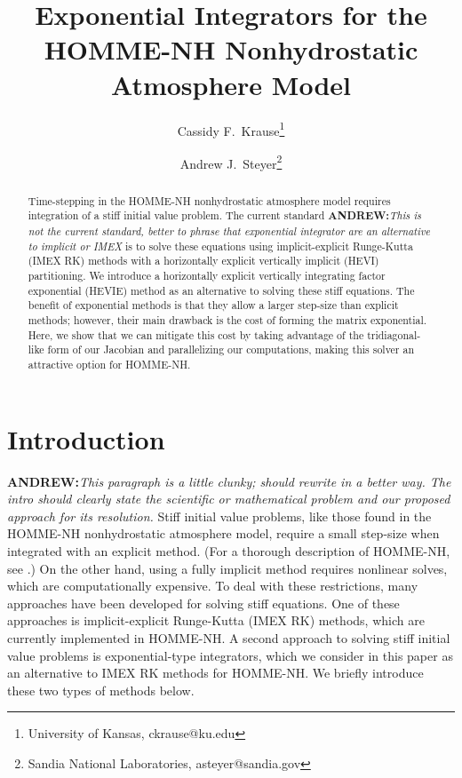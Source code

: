 \documentclass{csri19}
\title{Exponential Integrators for the HOMME-NH Nonhydrostatic Atmosphere
 Model}
\author{Cassidy F.\ Krause\thanks{University of Kansas, ckrause@ku.edu}
\and Andrew J.\ Steyer\thanks{Sandia National Laboratories, asteyer@sandia.gov}}
\newcommand{\A}[1]{\textbf{ANDREW:}\textit{#1}}
\begin{document}
\maketitle

\begin{abstract}
Time-stepping in the HOMME-NH nonhydrostatic atmosphere model requires 
integration of a stiff initial value problem. The current standard \A{This is not the current standard, better to phrase that exponential integrator are an alternative to implicit or IMEX} is to 
solve these equations using implicit-explicit Runge-Kutta (IMEX RK) 
methods with a horizontally explicit vertically implicit (HEVI) 
partitioning. We introduce a horizontally explicit vertically integrating 
factor exponential (HEVIE) method as an alternative to solving 
these stiff equations. The benefit of exponential methods is that they 
allow a larger step-size than explicit methods; however, their main 
drawback is the cost of forming the matrix exponential. Here, we show that 
we can mitigate this cost by taking advantage of the tridiagonal-like form 
of our Jacobian and parallelizing our computations, making this solver an 
attractive option for HOMME-NH.
\end{abstract}

\section{Introduction} \label{CFK:sec:intro}
\A{This paragraph is a little clunky; should rewrite in a better way.  The intro should clearly state the scientific or mathematical problem and our proposed approach for its resolution.}
Stiff initial value problems, like those found in the HOMME-NH 
nonhydrostatic atmosphere model, require a small step-size when integrated 
with an explicit method. (For a thorough description of HOMME-NH, see 
\cite{CFK:preprint}.) On the other hand, using a fully implicit method 
requires nonlinear solves, which are computationally expensive. To deal 
with these restrictions, many approaches have been developed for solving 
stiff equations. One of these approaches is implicit-explicit Runge-Kutta 
(IMEX RK) methods, which are currently implemented in HOMME-NH. A second 
approach to solving stiff initial value problems is exponential-type 
integrators, which we consider in this paper as an alternative to IMEX RK 
methods for HOMME-NH. We briefly introduce these two types of methods 
below.
\end{document}
